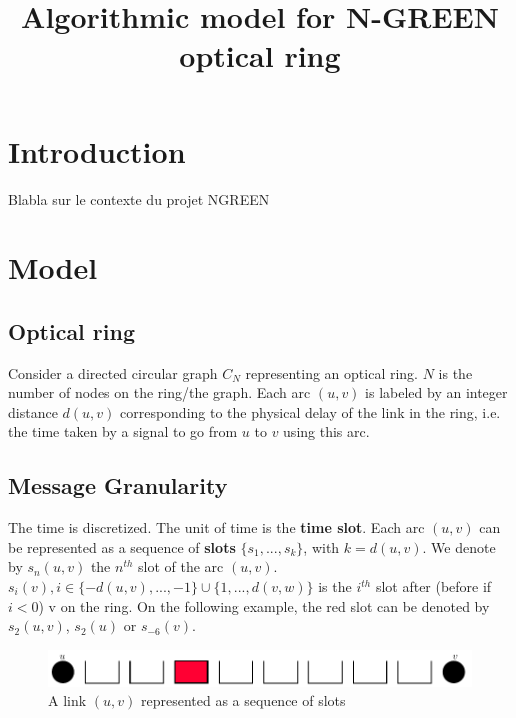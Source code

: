 \documentclass[a4paper,10pt]{article}
\title{Algorithmic model for N-GREEN optical ring}
\begin{document}
\maketitle
\section{Introduction}
Blabla sur le contexte du projet NGREEN



\section{Model}
  \label{model}
  \subsection{Optical ring}
  Consider a directed circular graph $C_N$ representing an optical ring. $N$ is the number of nodes on the ring/the graph. Each arc $(u,v)$ is labeled by an integer distance $d(u,v)$ corresponding to the physical delay of the link in the ring, i.e. the time taken by a signal to go from $u$ to $v$ using this arc.
  
  \subsection{Message Granularity}
    The time is discretized. The unit of time is the {\bf time slot}. Each arc $(u,v)$ can be represented as a sequence of {\bf slots} $\{s_1, ... , s_k\}$, with $k = d(u,v)$. We denote by $s_n(u,v)$ the $n^{th}$ slot of the arc $(u,v)$. $s_i(v), i\in \{-d(u,v), ... , -1\} \cup \{1 , ... , d(v,w)\}$ is the $i^{th}$ slot after (before if $i<0$) v on the ring.
    On the following example, the red slot can be denoted by $s_2(u,v)$, $s_2(u)$ or $s_{-6}(v)$. 
    \begin{figure}[h]
    \centering
      \includegraphics[scale=0.5]{suv.pdf}

      \caption{A link $(u,v)$ represented as a sequence of slots}
  \end{figure}
  
\end{document}
